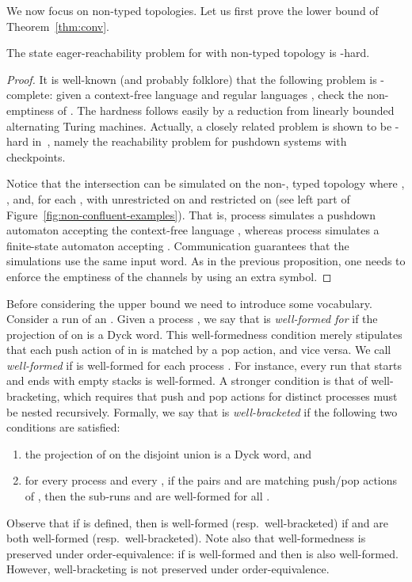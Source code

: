 \documentclass{LMCS}
\newenvironment{proposition}{\begin{prop}}{\end{prop}}
\begin{document}
We now focus on non-\converging typed topologies.
Let us first prove the \dexptime lower bound of
Theorem~\ref{thm:conv}.

\begin{proposition} \label{prop:non-confluent-lb} The state
 eager-reachability problem for  \rqcp
  with non-\converging typed topology is  \dexptime-hard.
\end{proposition}

\begin{proof}
It is well-known (and probably folklore) that the following problem is
\dexptime-complete: 
given a context-free language  and  regular languages ,
check the non-emptiness of .
The hardness follows easily by a reduction from linearly bounded
alternating Turing 
machines.
Actually, a closely related problem is shown to be \dexptime-hard
in~\cite{esparza-j-2003-355-a}, namely the reachability problem for
pushdown systems with
checkpoints.

Notice that the intersection  can be simulated
on the non-\converging, 
typed topology  where
, , and,
for each ,
 with  unrestricted on  and
 restricted on  (see left part of
Figure~\ref{fig:non-confluent-examples}). That is, process 
simulates a pushdown automaton accepting the context-free language
, whereas process  simulates a finite-state automaton
accepting . Communication guarantees that the simulations
use the same input word. As in the previous proposition, one needs to
enforce the emptiness of the channels by using an extra symbol.
\end{proof}


Before considering the upper bound we need to introduce some
vocabulary. Consider a run  of an
\rqcp .  Given a process , we say that  is
\emph{well-formed for } if the projection of  on  is a  Dyck word.  This
well-formedness condition merely stipulates that each push action of
 in  is matched by a pop action, and vice versa.  We
call  \emph{well-formed} if  is well-formed for each
process .  For instance, every run that starts and ends with
empty stacks  is well-formed.  A stronger condition is that of
well-bracketing, which requires that push and pop actions for distinct
processes must be nested recursively.
Formally, we say that  is
\emph{well-bracketed} if the following two conditions are satisfied:
\begin{enumerate}
\item
  the projection of  on the disjoint union
   is a Dyck word, and
\item
  for every process  and every ,
  if the pairs  and  are matching push/pop actions
  of , then the sub-runs  and
   are
  well-formed for all .
\end{enumerate}
Observe that if  is defined, then  is
well-formed (resp.~well-bracketed) if   and  are both
well-formed (resp.~well-bracketed).  Note also that well-formedness is
preserved under order-equivalence: if  is well-formed and  then  is also well-formed.  However,
well-bracketing is not preserved under order-equivalence.
\end{document}
